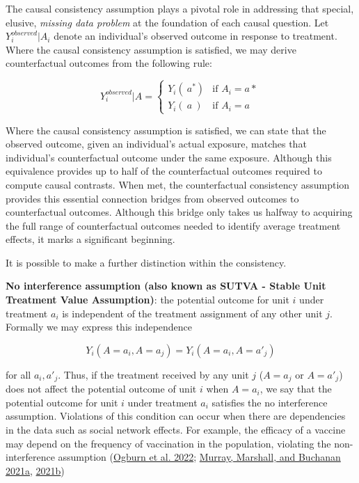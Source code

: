 \documentclass[
  singlecolumn]{article}
\begin{document}
The causal consistency assumption plays a pivotal role in addressing
that special, elusive, \emph{missing data problem} at the foundation of
each causal question. Let \(Y_i^{observed}|A_i\) denote an individual's
observed outcome in response to treatment. Where the causal consistency
assumption is satisfied, we may derive counterfactual outcomes from the
following rule:

\[
Y_i^{observed}|A = 
\begin{cases} 
Y_i(~a^*) & \text{if } A_i = a* \\
Y_i(~a~) & \text{if } A_i = a
\end{cases}
\]

Where the causal consistency assumption is satisfied, we can state that
the observed outcome, given an individual's actual exposure, matches
that individual's counterfactual outcome under the same exposure.
Although this equivalence provides up to half of the counterfactual
outcomes required to compute causal contrasts. When met, the
counterfactual consistency assumption provides this essential connection
bridges from observed outcomes to counterfactual outcomes. Although this
bridge only takes us halfway to acquiring the full range of
counterfactual outcomes needed to identify average treatment effects, it
marks a significant beginning.

It is possible to make a further distinction within the consistency.

\textbf{No interference assumption (also known as SUTVA - Stable Unit
Treatment Value Assumption)}: the potential outcome for unit \(i\) under
treatment \(a_i\) is independent of the treatment assignment of any
other unit \(j\). Formally we may express this independence

\[
Y_i(A=a_i, A=a_j) = Y_i(A=a_i, A=a'_j)
\]

for all \(a_i, a'_j\). Thus, if the treatment received by any unit \(j\)
(\(A=a_j\) or \(A=a'_j\)) does not affect the potential outcome of unit
\(i\) when \(A=a_i\), we say that the potential outcome for unit \(i\)
under treatment \(a_i\) satisfies the no interference assumption.
Violations of this condition can occur when there are dependencies in
the data such as social network effects. For example, the efficacy of a
vaccine may depend on the frequency of vaccination in the population,
violating the non-interference assumption
(\protect\hyperlink{ref-ogburn2022}{Ogburn et al. 2022};
\protect\hyperlink{ref-murray2021}{Murray, Marshall, and Buchanan
2021a}, \protect\hyperlink{ref-murray2021a}{2021b})
\end{document}
